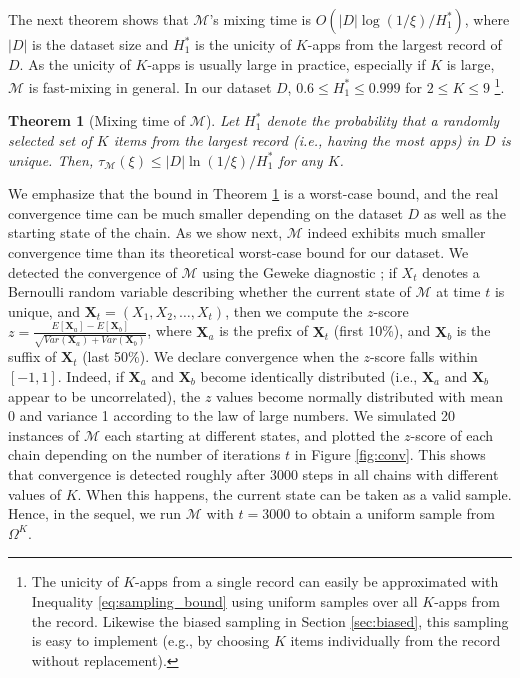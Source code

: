 \documentclass{acm_proc_article-sp}
\theoremstyle{plain}
\theoremstyle{plain}
\newtheorem{theorem}{Theorem}
\theoremstyle{plain}
\theoremstyle{plain}
\theoremstyle{plain}
\theoremstyle{plain}
\begin{document}
The next theorem shows that $\mathcal{M}$'s mixing time is $O(|D|\log(1/\xi)/H_1^*)$, where $|D|$ is the dataset size and $H_1^*$ is the unicity of $K$-apps from the largest record of $D$. 
As the unicity of $K$-apps is usually large in practice, especially if $K$ is large, $\mathcal{M}$ is fast-mixing in general. In our dataset $D$, $0.6 \leq H_1^* \leq 0.999$ for $2\leq K \leq 9$ \footnote{The unicity of $K$-apps from a single record can easily be approximated with Inequality \ref{eq:sampling_bound} using uniform samples over all $K$-apps from the record. Likewise the biased sampling in Section \ref{sec:biased}, this sampling is easy to implement (e.g., by choosing $K$ items individually from the record without replacement).}.

\begin{theorem}[Mixing time of $\mathcal{M}$] 
\label{THM:MIXING}
Let $H_1^*$ denote the probability that a randomly selected set of $K$ items from the largest record  (i.e., having the most apps) in $D$ is unique. Then,
$\tau_{\mathcal{M}}(\xi) \leq |D|\ln(1/\xi)/H_1^*$ for any $K$. 
\end{theorem}

We emphasize that the bound in Theorem \ref{THM:MIXING} is a worst-case bound, and the real convergence time can be much smaller depending on the dataset $D$ as well as the starting state of the chain. As we show next, $\mathcal{M}$ indeed exhibits much smaller convergence time than its theoretical worst-case bound for our dataset. 
We detected the convergence of $\mathcal{M}$ using the Geweke diagnostic \cite{Geweke92}; if $X_t$ denotes a Bernoulli random variable describing whether the current state of $\mathcal{M}$ at time $t$ is unique, and $\mathbf{X}_t = (X_1, X_2, \ldots, X_t)$, then we compute the $z$-score  
$z= \frac{E[\mathbf{X}_a] - E[\mathbf{X}_b]}{\sqrt{\mathit{Var}(\mathbf{X}_a) + \mathit{Var}(\mathbf{X}_b)}}$, where $\mathbf{X}_a$ is the prefix of $\mathbf{X}_t$ (first 10\%), and $\mathbf{X}_b$ is the suffix of $\mathbf{X}_t$ (last 50\%). 
 We declare convergence when the $z$-score falls within $[-1,1]$. Indeed, if $\mathbf{X}_a$ and $\mathbf{X}_b$ become identically distributed (i.e., $\mathbf{X}_a$ and $\mathbf{X}_b$ appear to be uncorrelated), the $z$ values become normally distributed with mean 0 and variance 1 according to the law of large numbers. 
We simulated 20 instances of $\mathcal{M}$ each starting at different states, and plotted the $z$-score of each chain depending on the number of iterations $t$ in Figure \ref{fig:conv}.
This shows that convergence is detected roughly after  3000 steps in all chains with different values of $K$.
When this happens, the current state can be taken as a valid sample. Hence, in the sequel, we run $\mathcal{M}$ with $t=3000$ to obtain a uniform sample from $\Omega^K$.
\end{document}
